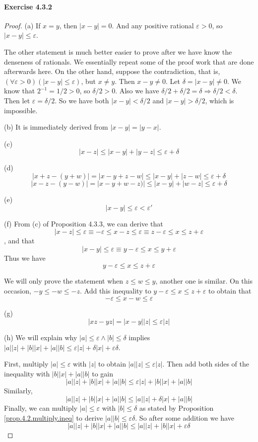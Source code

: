 \paragraph{Exercise 4.3.2} \label{exercise4.3.2}
\begin{proof}
(a)
If $x=y$, then $|x-y| = 0$. And any positive rational $\varepsilon >0$, so $|x-y|\leq\varepsilon$.

The other statement is much better easier to prove after we have know the denseness of rationals. We 
essentially repeat some of the proof work that are done afterwards here.
On the other hand, suppose the contradiction, that is, $(\forall \varepsilon>0)(|x-y| \leq \varepsilon)$, but 
$x\neq y$. Then $x-y \neq 0$. Let $\delta = |x-y| \neq 0$. We know that $2^{-1} = 1/2 > 0$, so 
$\delta / 2 > 0$. Also we have $\delta /2 + \delta /2 = \delta \Longrightarrow \delta /2 < \delta$. Then let 
$\varepsilon = \delta /2$. So we have both $|x-y| < \delta/2$ and $|x-y| > \delta /2$, which is impossible. 

(b)
It is immediately derived from $|x-y| = |y-x|$.

(c)
\[
|x-z| \leq |x-y| + |y-z| \leq \varepsilon + \delta
\]

(d)
\[
|x+z - (y+w)| = |x-y + z-w| \leq |x-y| + |z-w| \leq \varepsilon + \delta
\]
\[
|x-z - (y-w)| = |x-y + w-z)| \leq |x-y| + |w-z| \leq \varepsilon + \delta
\]

(e)
\[
|x-y| \leq \varepsilon < \varepsilon'
\]

(f)
From (c) of Proposition 4.3.3, we can derive that
\[
|x-z| \leq \varepsilon \equiv -\varepsilon \leq x-z \leq \varepsilon 
\equiv z-\varepsilon \leq x \leq z+ \varepsilon
\]
, and that
\[
|x-y| \leq \varepsilon \equiv y-\varepsilon \leq x \leq y + \varepsilon
\]
Thus we have
\[
y-\varepsilon \leq x \leq z + \varepsilon
\]

We will only prove the statement when $z\leq w \leq y$, another one is similar. On this occasion, 
$-y \leq -w \leq -z$. Add this inequality to $y-\varepsilon \leq x \leq z + \varepsilon$ to obtain that 
\[
-\varepsilon \leq x-w \leq \varepsilon
\]

(g)
\[
|xz-yz| = |x-y||z| \leq \varepsilon|z|
\]

(h)
We will explain why $|a| \leq \varepsilon \wedge |b| \leq \delta$ implies 
$|a||z| + |b||x| + |a||b| \leq \varepsilon|z| + \delta|x| + \varepsilon\delta$.

First, multiply $|a| \leq \varepsilon$ with $|z|$ to obtain $|a||z| \leq \varepsilon |z|$. Then add both sides 
of the inequality with $|b||x| + |a||b|$ to gain 
\[
|a||z| + |b||x| + |a||b| \leq \varepsilon |z| + |b||x| + |a||b| \tag{1}
\]
Similarly,
\[
|a||z| + |b||x| + |a||b| \leq |a||z| + \delta |x| + |a||b| \tag{2}
\]
Finally, we can multiply $|a| \leq \varepsilon$ with $|b| \leq \delta$ as stated by Proposition 
\ref{prop.4.2.multiply.ineq} to derive $|a||b| \leq \varepsilon\delta$. So after some addition we have
\[
|a||z| + |b||x| + |a||b| \leq |a||z| + |b||x| + \varepsilon\delta \tag{3}
\]


\end{proof}
